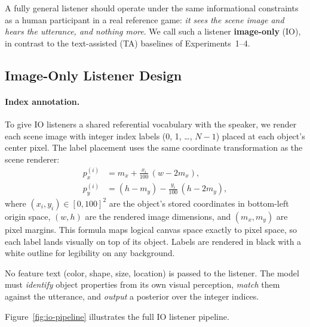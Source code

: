 \documentclass[11pt]{article}
\begin{document}
A fully general listener should operate under the same informational constraints
as a human participant in a real reference game: \emph{it sees the scene image and
hears the utterance, and nothing more}.  We call such a listener
\textbf{image-only} (IO), in contrast to the text-assisted (TA) baselines of
Experiments~1--4.

\subsection{Image-Only Listener Design}
\label{sec:io-design}

\paragraph{Index annotation.}
To give IO listeners a shared referential vocabulary with the speaker, we render
each scene image with integer index labels (0, 1, \ldots, $N{-}1$) placed at
each object's center pixel.  The label placement uses the same coordinate
transformation as the scene renderer:
\begin{align}
    p_x^{(i)} &= m_x + \frac{x_i}{100}\,(w - 2m_x), \\
    p_y^{(i)} &= (h - m_y) - \frac{y_i}{100}\,(h - 2m_y),
\end{align}
where $(x_i, y_i) \in [0,100]^2$ are the object's stored coordinates in
bottom-left origin space, $(w, h)$ are the rendered image dimensions, and
$(m_x, m_y)$ are pixel margins.  This formula maps logical canvas space
exactly to pixel space, so each label lands visually on top of its object.
Labels are rendered in black with a white outline for legibility on any background.

No feature text (color, shape, size, location) is passed to the listener.
The model must \emph{identify} object properties from its own visual perception,
\emph{match} them against the utterance, and \emph{output} a posterior over
the integer indices.

Figure~\ref{fig:io-pipeline} illustrates the full IO listener pipeline.
\end{document}
